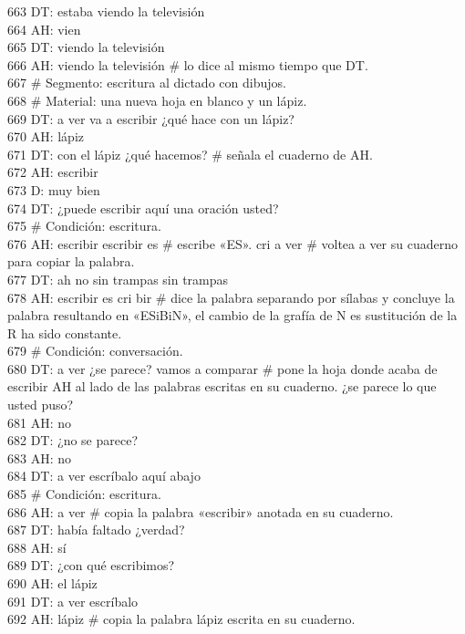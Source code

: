 663 DT: estaba viendo la televisión\\
664 AH: vien\\
665 DT: viendo la televisión\\
666 AH: viendo la televisión \# lo dice al mismo tiempo que DT.\\
667 \# Segmento: escritura al dictado con dibujos.\\
668 \# Material: una nueva hoja en blanco y un lápiz.\\
669 DT: a ver va a escribir ¿qué hace con un lápiz?\\
670 AH: lápiz\\
671 DT: con el lápiz ¿qué hacemos? \# señala el cuaderno de AH.\\
672 AH: escribir\\
673 D: muy bien\\
674 DT: ¿puede escribir aquí una oración usted?\\
675 \# Condición: escritura.\\
676 AH: escribir escribir es \# escribe «ES». cri a ver \# voltea a ver su cuaderno para copiar la palabra. \\
677 DT: ah no sin trampas sin trampas\\
678 AH: escribir es cri bir \# dice la palabra separando por sílabas y concluye la palabra resultando en «ESiBiN», el cambio de la grafía de N es sustitución de la R ha sido constante.\\
679 \# Condición: conversación.\\
680 DT: a ver ¿se parece? vamos a comparar \# pone la hoja donde acaba de escribir AH al lado de las palabras escritas en su cuaderno. ¿se parece lo que usted puso?\\
681 AH: no\\
682 DT: ¿no se parece?\\
683 AH: no\\
684 DT: a ver escríbalo aquí abajo\\
685 \# Condición: escritura.\\
686 AH: a ver \# copia la palabra «escribir» anotada en su cuaderno.\\
687 DT: había faltado ¿verdad?\\
688 AH: sí\\
689 DT: ¿con qué escribimos?\\
690 AH: el lápiz\\
691 DT: a ver escríbalo\\
692 AH: lápiz \# copia la palabra lápiz escrita en su cuaderno.\\
